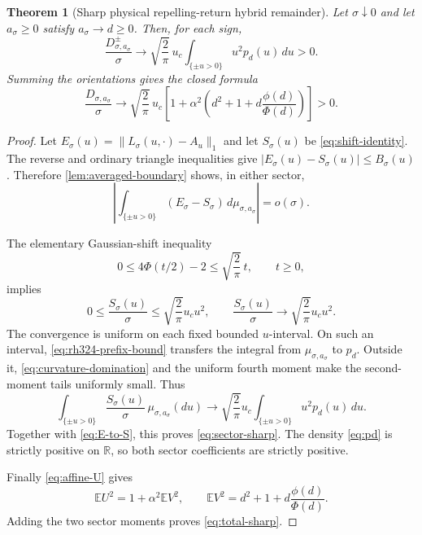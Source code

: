 \documentclass[11pt]{article}
\newtheorem{theorem}{Theorem}[section]
\theoremstyle{definition}
\theoremstyle{remark}
\newcommand{\R}{\mathbb R}
\newcommand{\1}{\mathbf 1}
\begin{document}
\begin{theorem}[Sharp physical repelling-return hybrid remainder]
\label{thm:transported-sharp}
Let $\sigma\downarrow0$ and let $a_\sigma\ge0$ satisfy
$a_\sigma\to d\ge0$.  Then, for each sign,
\begin{equation}\label{eq:sector-sharp}
 \boxed{
 \frac{D^{\pm}_{\sigma,a_\sigma}}{\sigma}
 \longrightarrow
 \sqrt{\frac2\pi}\,u_c
 \int_{\{\pm u>0\}}u^2p_d(u)\,du>0.}
\end{equation}
Summing the orientations gives the closed formula
\begin{equation}\label{eq:total-sharp}
 \boxed{
 \frac{D_{\sigma,a_\sigma}}\sigma
 \longrightarrow
 \sqrt{\frac2\pi}\,u_c
 \left[
 1+\alpha^2\left(
 d^2+1+d\frac{\phi(d)}{\Phi(d)}
 \right)
 \right]>0.}
\end{equation}
\end{theorem}

\begin{proof}
Let $E_\sigma(u)=\|L_\sigma(u,\cdot)-A_u\|_1$ and let
$S_\sigma(u)$ be \eqref{eq:shift-identity}.  The reverse and ordinary
triangle inequalities give
$|E_\sigma(u)-S_\sigma(u)|\le B_\sigma(u)$.  Therefore
\cref{lem:averaged-boundary} shows, in either sector,
\begin{equation}\label{eq:E-to-S}
 \left|\int_{\{\pm u>0\}}(E_\sigma-S_\sigma)
 \,d\mu_{\sigma,a_\sigma}\right|=o(\sigma).
\end{equation}

The elementary Gaussian-shift inequality
\[
 0\le4\Phi(t/2)-2\le\sqrt{\frac2\pi}\,t,
 \qquad t\ge0,
\]
implies
\begin{equation}\label{eq:curvature-domination}
 0\le\frac{S_\sigma(u)}\sigma
 \le\sqrt{\frac2\pi}u_cu^2,
 \qquad
 \frac{S_\sigma(u)}\sigma
 \longrightarrow\sqrt{\frac2\pi}u_cu^2.
\end{equation}
The convergence is uniform on each fixed bounded $u$-interval.  On such an
interval, \eqref{eq:rh324-prefix-bound} transfers the integral from
$\mu_{\sigma,a_\sigma}$ to $p_d$.  Outside it,
\eqref{eq:curvature-domination} and the uniform fourth moment make the
second-moment tails uniformly small.  Thus
\[
 \int_{\{\pm u>0\}}\frac{S_\sigma(u)}\sigma
 \,\mu_{\sigma,a_\sigma}(du)
 \longrightarrow
 \sqrt{\frac2\pi}u_c
 \int_{\{\pm u>0\}}u^2p_d(u)\,du.
\]
Together with \eqref{eq:E-to-S}, this proves \eqref{eq:sector-sharp}.
The density \eqref{eq:pd} is strictly positive on $\R$, so both sector
coefficients are strictly positive.

Finally \eqref{eq:affine-U} gives
\[
 \mathbb EU^2=1+\alpha^2\mathbb EV^2,
 \qquad
 \mathbb EV^2=d^2+1+d\frac{\phi(d)}{\Phi(d)}.
\]
Adding the two sector moments proves \eqref{eq:total-sharp}.
\end{proof}
\end{document}
